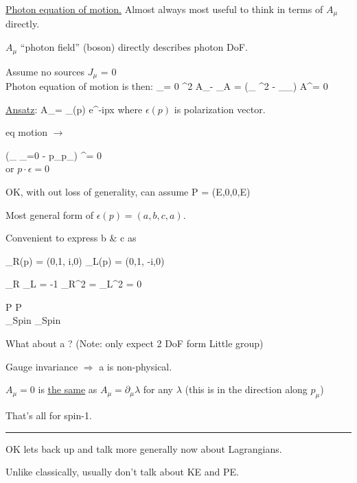 {\underline{Photon equation of motion.}
Almost always most useful to think in terms of $A_\mu$ directly. 

$A_\mu$ ``photon field'' (boson) directly describes photon DoF.

Assume no sources $J_\mu$ = 0\\
Photon equation of motion is then:
\be
\partial_\mu \fMN  = 0  \Rightarrow  \partial^2 A_\mu - \partial_\mu \partial \cdot A = (\eta_{\mu\nu} \partial^2 - \partial_\mu  \partial_\nu ) A^\nu = 0
\ee


\underline{Ansatz}:
\be
A_\mu = \epsilon_\mu(p) e^{-ip\cdot x}
\ee
where $\epsilon(p)$ is  polarization vector.

eq motion $\rightarrow$ 

\bea
(\eta_{\mu\nu} _{=0} - p_\mu  p_\nu ) \epsilon^\nu = 0\\
\eea
or $p\cdot \epsilon = 0$

OK, with out loss of generality, can assume
\be
P = (E,0,0,E)
\ee 

Most general form of $\epsilon(p) = (a, b, c, a)$. 


Convenient to express b \& c as

\be
\epsilon_R(p) = (0,1, i,0)  \hspace{1in} \epsilon_L(p) = (0,1, -i,0)
\ee


\be
\epsilon_R \cdot \epsilon_L = -1 \hspace{1in}  {\epsilon_R}^2 = {\epsilon_L}^2 = 0
\ee

\bea
\longrightarrow P \hspace{1in} \longrightarrow P\\
\underbrace{\rightarrow}_{Spin} \hspace{1in}  \underbrace{\leftarrow}_{Spin}
\eea


What about a ? 
(Note: only expect 2 DoF form Little group) 

Gauge invariance $\Rightarrow$ a is non-physical. 


$A_\mu = 0 $ is \underline{\underline{the same}} as $A_\mu = \partial_\mu \lambda$ for any $\lambda$
(this is in the direction along $p_\mu$)

That's all for spin-1. 

\noindent\rule{\textwidth}{1pt}

OK lets back up and talk more generally now about Lagrangians. 

Unlike classically, usually don't talk about KE and PE. 

}

